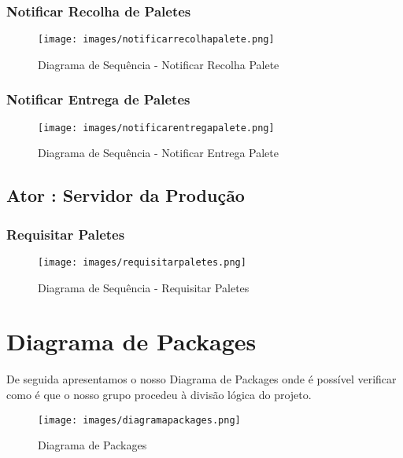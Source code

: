 \documentclass[11pt]{article}
\begin{document}
\subsubsection{Notificar Recolha de Paletes}

\begin{figure}[htb]
    \centering
    \texttt{[image: images/notificarrecolhapalete.png]}
    \caption{Diagrama de Sequência - Notificar Recolha Palete}
    \label{fig:my_label3}
\end{figure}

\clearpage

\subsubsection{Notificar Entrega de Paletes}

\begin{figure}[htb]
    \centering
    \texttt{[image: images/notificarentregapalete.png]}
    \caption{Diagrama de Sequência - Notificar Entrega Palete}
    \label{fig:my_label3}
\end{figure}

\clearpage

\subsection{Ator : Servidor da Produção}

\subsubsection{Requisitar Paletes}

\begin{figure}[htb]
    \centering
    \texttt{[image: images/requisitarpaletes.png]}
    \caption{Diagrama de Sequência - Requisitar Paletes}
    \label{fig:my_label3}
\end{figure}

\clearpage

\section{Diagrama de Packages}

De seguida apresentamos o nosso Diagrama de Packages onde é possível verificar como é que o nosso grupo procedeu à divisão lógica do projeto.

\begin{figure}[htb]
    \centering
    \texttt{[image: images/diagramapackages.png]}
    \caption{Diagrama de Packages}
    \label{fig:my_label3}
\end{figure}
\end{document}

